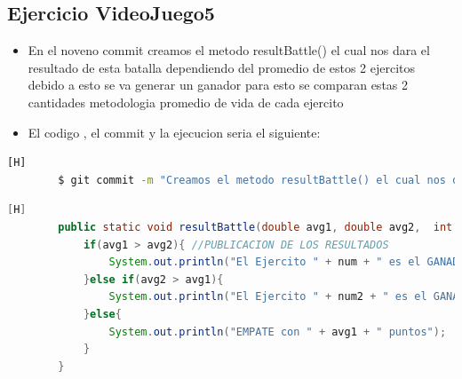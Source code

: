 \documentclass{article}
\begin{document}
	\subsection{Ejercicio VideoJuego5}
	\begin{itemize}	
		\item En el noveno commit creamos el metodo resultBattle() el cual nos dara el resultado de esta batalla dependiendo del promedio de estos 2 ejercitos debido a esto se va generar un ganador para esto se comparan estas 2 cantidades metodologia promedio de vida de cada ejercito
		\item El codigo , el commit y la ejecucion seria el siguiente:
	\end{itemize}	
	\begin{lstlisting}[language=bash,caption={Commit}][H]
		$ git commit -m "Creamos el metodo resultBattle() el cual nos dara el resultado de esta batalla dependiendo del promedio de estos 2 ejercitos debido a esto se va generar un ganador para esto se comparan estas 2 cantidades metodologia promedio de vida de cada ejercito"
	\end{lstlisting}	
	\begin{lstlisting}[language=java,caption={Las lineas de codigos del metodo creado:}][H]
		public static void resultBattle(double avg1, double avg2,  int num, int num2){ //METODO CREADO PARA PODER SABER EL RESULTADO DE ESTA BATALLA ENTRE ESTOS 2 EJERCITOS
			if(avg1 > avg2){ //PUBLICACION DE LOS RESULTADOS
				System.out.println("El Ejercito " + num + " es el GANADOR con " + avg1+ " puntos");
			}else if(avg2 > avg1){
				System.out.println("El Ejercito " + num2 + " es el GANADOR con " + avg2 + " puntos");
			}else{
				System.out.println("EMPATE con " + avg1 + " puntos");
			}
		}
	\end{lstlisting}
\end{document}
